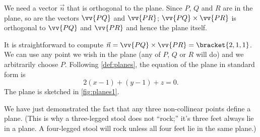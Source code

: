 {We need a vector $\vec n$ that is orthogonal to the plane. Since $P$, $Q$ and $R$ are in the plane, so are the vectors $\vv{PQ}$ and $\vv{PR}$; $\vv{PQ}\times\vv{PR}$ is orthogonal to $\vv{PQ}$ and $\vv{PR}$ and hence the plane itself.

It is straightforward to compute $\vec n = \vv{PQ}\times\vv{PR} =\bracket{2,1,1}$. We can use any point we wish in the plane (any of $P$, $Q$ or $R$ will do) and we arbitrarily choose $P$. Following \autoref{def:planes}, the equation of the plane in standard form is 
\[2(x-1) + (y-1)+z = 0.\]
The plane is sketched in \autoref{fig:planes1}.}

We have just demonstrated the fact that any three non-collinear points define a plane. (This is why a three-legged stool does not ``rock;'' it's three feet always lie in a plane. A four-legged stool will rock unless all four feet lie in the same plane.)

